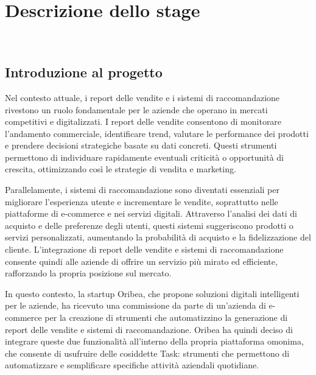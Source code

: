 \chapter{Descrizione dello stage}
\label{cap:descrizione-stage}

\\

\section{Introduzione al progetto}

Nel contesto attuale, i report delle vendite e i sistemi di raccomandazione rivestono un ruolo fondamentale per le aziende che operano in mercati competitivi e digitalizzati. I report delle vendite consentono di monitorare l’andamento commerciale, identificare trend, valutare le performance dei prodotti e prendere decisioni strategiche basate su dati concreti. Questi strumenti permettono di individuare rapidamente eventuali criticità o opportunità di crescita, ottimizzando così le strategie di vendita e marketing.

Parallelamente, i sistemi di raccomandazione sono diventati essenziali per migliorare l’esperienza utente e incrementare le vendite, soprattutto nelle piattaforme di e-commerce e nei servizi digitali. Attraverso l’analisi dei dati di acquisto e delle preferenze degli utenti, questi sistemi suggeriscono prodotti o servizi personalizzati, aumentando la probabilità di acquisto e la fidelizzazione del cliente. L’integrazione di report delle vendite e sistemi di raccomandazione consente quindi alle aziende di offrire un servizio più mirato ed efficiente, rafforzando la propria posizione sul mercato.

In questo contesto, la startup Oribea, che propone soluzioni digitali intelligenti per le aziende, ha ricevuto una commissione da parte di un'azienda di e-commerce per la creazione di strumenti che automatizzino la generazione di report delle vendite e sistemi di raccomandazione. Oribea ha quindi deciso di integrare queste due funzionalità all’interno della propria piattaforma omonima, che consente di usufruire delle cosiddette Task: strumenti che permettono di automatizzare e semplificare specifiche attività aziendali quotidiane.

